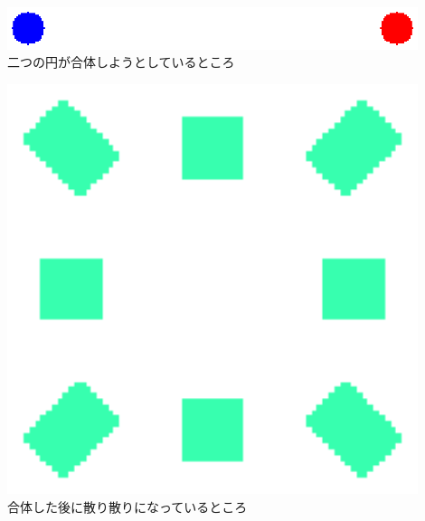 \documentclass[12pt,a4j]{jarticle}
\begin{document}
\begin{center}
\includegraphics[width=12cm]{mypicture.ps}\\二つの円が合体しようとしているところ
\end{center}

\begin{center}
\includegraphics[width=12cm]{mypicture1.ps}\\合体した後に散り散りになっているところ
\end{center}
\end{document}
